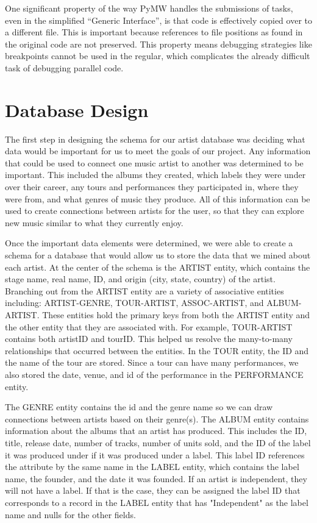 \documentclass{sig-alternate}
\begin{document}
One significant property of the way PyMW handles the submissions of tasks, even in the simplified ``Generic Interface'',
is that code is effectively copied over to a different file. This is important because references to file positions as
found in the original code are not preserved. This property means debugging strategies like breakpoints cannot be used
in the regular, which complicates the already difficult task of debugging parallel code.

\section{Database Design}
\label{db design}

The first step in designing the schema for our artist database was deciding what data would be important
for us to meet the goals of our project. Any information that could be used to connect one music artist 
to another was determined to be important. This included the albums they created, which labels they were 
under over their career, any tours and performances they participated in, where they were from, and what 
genres of music they produce. All of this information can be used to create connections between artists for 
the user, so that they can explore new music similar to what they currently enjoy.

Once the important data elements were determined, we were able to create a schema for a database that would 
allow us to store the data that we mined about each artist. At the center of the schema is the ARTIST entity, 
which contains the stage name, real name, ID, and origin (city, state, country) of the artist. Branching out 
from the ARTIST entity are a variety of associative entities including: ARTIST-GENRE, TOUR-ARTIST, ASSOC-ARTIST, 
and ALBUM-ARTIST. These entities hold the primary keys from both the ARTIST entity and the other entity that 
they are associated with. For example, TOUR-ARTIST contains both artistID and tourID. This helped us resolve 
the many-to-many relationships that occurred between the entities. In the TOUR entity, the ID and the name of 
the tour are stored. Since a tour can have many performances, we also stored the date, venue, and id of the 
performance in the PERFORMANCE entity.

The GENRE entity contains the id and the genre name so we can draw connections between artists based on their 
genre(s). The ALBUM entity contains information about the albums that an artist has produced. This includes the 
ID, title, release date, number of tracks, number of units sold, and the ID of the label it was produced under 
if it was produced under a label. This label ID references the attribute by the same name in the LABEL entity, 
which contains the label name, the founder, and the date it was founded. If an artist is independent, they will 
not have a label. If that is the case, they can be assigned the label ID that corresponds to a record in the 
LABEL entity that has "Independent" as the label name and nulls for the other fields.
\end{document}
